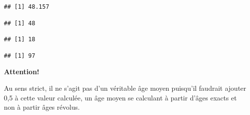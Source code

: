 \documentclass[
]{book}
\newenvironment{Shaded}{\begin{snugshade}}{\end{snugshade}}
\newcommand{\FunctionTok}[1]{\textcolor[rgb]{0.00,0.00,0.00}{#1}}
\newcommand{\NormalTok}[1]{#1}
\newcommand{\SpecialCharTok}[1]{\textcolor[rgb]{0.00,0.00,0.00}{#1}}
\begin{document}
\begin{Shaded}
\end{Shaded}

\begin{verbatim}
## [1] 48.157
\end{verbatim}

\begin{Shaded}
\end{Shaded}

\begin{verbatim}
## [1] 48
\end{verbatim}

\begin{Shaded}
\end{Shaded}

\begin{verbatim}
## [1] 18
\end{verbatim}

\begin{Shaded}
\end{Shaded}

\begin{verbatim}
## [1] 97
\end{verbatim}

\begin{blackbox}

\begin{center}
\textbf{Attention!}

\end{center}

Au sens strict, il ne s'agit pas d'un véritable âge moyen puisqu'il faudrait ajouter 0,5 à cette valeur calculée, un âge moyen se calculant à partir d'âges exacts et non à partir âges révolus.

\end{blackbox}
\end{document}
